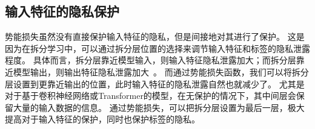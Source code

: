 \subsection{输入特征的隐私保护}
势能损失虽然没有直接保护输入特征的隐私，但是间接地对其进行了保护。
%
这是因为在拆分学习中，可以通过拆分层位置的选择来调节输入特征和标签的隐私泄露程度。
具体而言，拆分层靠近模型输入，则输入特征隐私泄露加大；而拆分层靠近模型输出，则输出特征隐私泄露加大~\cite{abuadbba2020can_split}。
%
而通过势能损失函数，我们可以将拆分层设置到更靠近输出的位置，此时输入特征的隐私泄露自然也就减少了。
%
尤其是对于基于卷积神经网络或Transformer的模型，在无保护的情况下，其中间层会保留大量的输入数据的信息。
通过势能损失，可以把拆分层设置为最后一层，极大提高对于输入特征的保护，同时也保护标签的隐私。
%